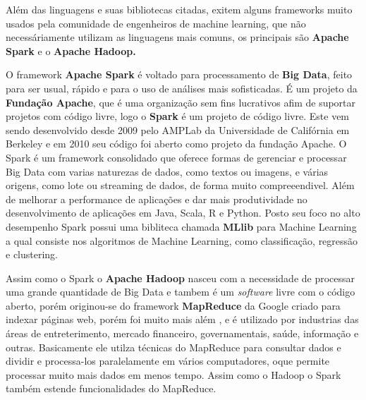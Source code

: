 \begin{figure}[h!]
	\centering
\end{figure}

Além das linguagens e suas bibliotecas citadas, exitem alguns frameworks muito usados pela comunidade de engenheiros de machine learning, 
que não necessáriamente utilizam as linguagens mais comuns, os principais são \textbf{Apache Spark} e o \textbf{Apache Hadoop.}

O framework \textbf{Apache Spark} é voltado para processamento de \textbf{Big Data}, feito para ser usual, rápido e para o uso de análises mais
sofisticadas. É um projeto da \textbf{Fundação Apache}, que é uma organização sem fins lucrativos afim de suportar 
projetos com código livre, logo o \textbf{Spark} é um projeto de código livre. Este vem sendo desenvolvido desde 2009 pelo 
AMPLab da Universidade de Califórnia em Berkeley e em 2010 seu código foi aberto como projeto da fundação Apache. 
O Spark é um framework consolidado que oferece formas de gerenciar e processar Big Data com varias naturezas de dados, como textos ou imagens, e várias origens,  
como lote ou streaming de dados,  de forma muito compreeendivel. Além de melhorar a performance de aplicações e dar mais produtividade no desenvolvimento
de aplicações em Java, Scala, R e Python. Posto seu foco no alto desempenho Spark possui uma bibliteca chamada \textbf{MLlib} para Machine Learning a qual 
consiste nos algoritmos de Machine Learning, como classificação, regressão e clustering.

Assim como o Spark o \textbf{Apache Hadoop} nasceu com a necessidade de processar uma grande quantidade de Big Data e tambem é um \textit{software} 
livre com o código aberto, porém originou-se do framework \textbf{MapReduce} da Google  criado para indexar páginas web, porém foi muito mais além 
, e é utilizado por industrias das áreas de entreterimento, mercado financeiro, governamentais, saúde, informação e outras. Basicamente ele utilza
técnicas do MapReduce para consultar dados e dividir e processa-los paralelamente em vários computadores, oque permite processar muito mais dados em menos
tempo. Assim como o Hadoop o Spark também estende funcionalidades do MapReduce.
 

